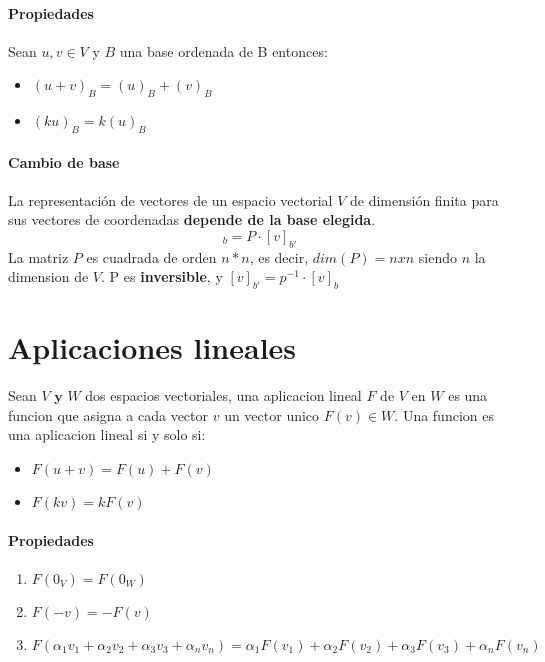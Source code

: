 \documentclass[10pt]{article}
\begin{document}
\paragraph{Propiedades}

Sean $u,v \in V$ y $B$ una base ordenada de B entonces:

\begin{itemize}
	\item $(u+v)_B = (u)_B+(v)_B$
	\item $(ku)_B = k(u)_B$
\end{itemize}

\paragraph{Cambio de base}

La representación de vectores de un espacio vectorial $V$ de dimensión finita para sus vectores de coordenadas \textbf{depende de la base elegida}.
\begin{equation*}
	[v]_b = P \cdot [v]_{b'}
\end{equation*}
La matriz $P$ es cuadrada de orden $n*n$, es decir, $dim(P) = nxn$ siendo $n$ la dimension de $V$. P es \textbf{inversible}, y $[v]_{b'} = p^{-1} \cdot [v]_b$


\section{Aplicaciones lineales}

Sean $V \textbf{ y } W$ dos espacios vectoriales, una aplicacion lineal $F$ de $V$ en $W$ es una funcion que asigna a cada vector $v$ un vector unico $F(v) \in W$. Una funcion es una aplicacion lineal si y solo si:

\begin{itemize}
	\item $F(u+v) = F(u) + F(v)$
	\item $F(kv) = kF(v)$
\end{itemize}

\paragraph{Propiedades}

\begin{enumerate}
	\item $F(0_V) = F(0_W)$
	\item $F(-v) = -F(v)$
	\item $F(\alpha_1 v_1 + \alpha_2 v_2 + \alpha_3 v_3 + \alpha_n v_n) = \alpha_1 F(v_1) + \alpha_2 F(v_2) + \alpha_3 F(v_3) + \alpha_n F(v_n)$
\end{enumerate}
\end{document}
